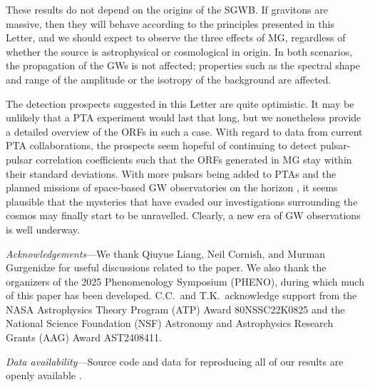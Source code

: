 \documentclass[10pt,prd,twocolumn,aps,nofootinbib,nobibnotes,superscriptaddress,preprintnumbers]{revtex4-2}
\begin{document}
These results do not depend on the origins of the SGWB. If gravitons are massive, then they will behave according to the principles presented in this Letter, and we should expect to observe the three effects of MG, regardless of whether the source is astrophysical or cosmological in origin. In both scenarios, the propagation of the GWs is not affected; properties such as the spectral shape and range of the amplitude \cite{Caprini:2015tfa} or the isotropy of the background \cite{NANOGrav:2023hvm} are affected.

The detection prospects suggested in this Letter are quite optimistic. It may be unlikely that a PTA experiment would last that long, but we nonetheless provide a detailed overview of the ORFs in such a case. With regard to data from current PTA collaborations, the prospects seem hopeful of continuing to detect pulsar-pulsar correlation coefficients such that the ORFs generated in MG stay within their standard deviations. With more pulsars being added to PTAs and the planned missions of space-based GW observatories on the horizon \cite{LISA:2017, TianQin:2015yph, Hu:2017mde}, it seems plausible that the mysteries that have evaded our investigations surrounding the cosmos may finally start to be unravelled. Clearly, a new era of GW observations is well underway. 

\vspace{3mm}
\textit{Acknowledgements}---We thank Qiuyue Liang, Neil Cornish, and Murman Gurgenidze for useful discussions related to the paper. We also thank the organizers of the 2025 Phenomenology Symposium (PHENO), during which much of this paper has been developed. C.C.~and T.K.~acknowledge support from the NASA Astrophysics Theory Program (ATP) Award 80NSSC22K0825 and the National Science Foundation (NSF) Astronomy and Astrophysics Research Grants (AAG) Award AST2408411.

\vspace{3mm}
\textit{Data availability}---Source code and data for reproducing all of our results are openly available \cite{Choi:2025git}.





\clearpage
\end{document}
